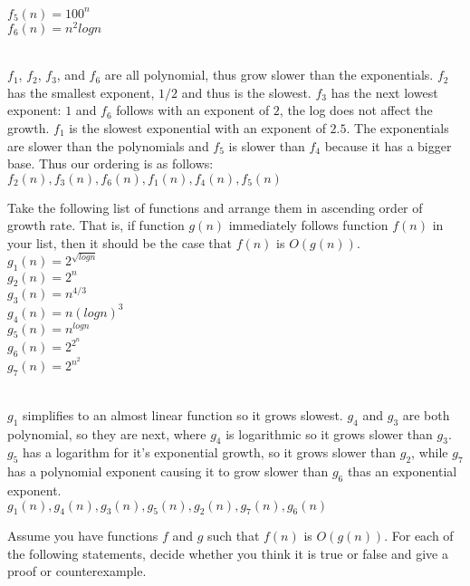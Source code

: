\documentclass{assignment}
\begin{document}
\begin{problemlist}
\begin{problem}
$f_5(n)=100^n$\\
$f_6(n)=n^2logn$\\
\end{problem}
\begin{answer}
\\
$f_1$, $f_2$, $f_3$, and $f_6$ are all polynomial, thus grow slower than the exponentials. $f_2$ has the smallest exponent, $1/2$ and thus is the slowest. $f_3$ has the next lowest exponent: $1$ and $f_6$ follows with an exponent of $2$, the log does not affect the growth. $f_1$ is the slowest exponential with an exponent of $2.5$. The exponentials are slower than the polynomials and $f_5$ is slower than $f_4$ because it has a bigger base. Thus our ordering is as follows:\\
$f_2(n), f_3(n), f_6(n), f_1(n), f_4(n), f_5(n)$\\
\end{answer}
\clearpage
\pbitem
\begin{problem}
Take the following list of functions and arrange them in ascending order of growth rate. That is, if function $g(n)$ immediately follows function $f(n)$ in your list, then it should be the case that $f(n)$ is $O(g(n))$.\\
$g_1(n)=2^{\sqrt{logn}}$\\
$g_2(n)=2^n$\\
$g_3(n)=n^{4/3}$\\
$g_4(n)=n(logn)^3$\\
$g_5(n)=n^{logn}$\\
$g_6(n)=2^{2^n}$\\
$g_7(n)=2^{n^2}$\\
\end{problem}
\begin{answer}
\\
$g_1$ simplifies to an almost linear function so it grows slowest. $g_4$ and $g_3$ are both polynomial, so they are next, where $g_4$ is logarithmic so it grows slower than $g_3$. $g_5$ has a logarithm for it's exponential growth, so it grows slower than $g_2$, while $g_7$ has a polynomial exponent causing it to grow slower than $g_6$ thas an exponential exponent.\\
$g_1(n), g_4(n), g_3(n), g_5(n), g_2(n), g_7(n), g_6(n)$\\
\end{answer}
\clearpage
\pbitem
\begin{problem}
Assume you have functions $f$ and $g$ such that $f(n)$ is $O(g(n))$. For each of the following statements, decide whether you think it is true or false and give a proof or counterexample.\\

\end{problem}
\end{problemlist}
\end{document}
